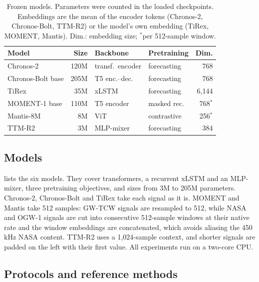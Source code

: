 \documentclass{article}
\begin{document}
\begin{table}[t]
  \caption{Frozen models. Parameters were counted in the loaded checkpoints. Embeddings are the mean of
  the encoder tokens (Chronos-2, Chronos-Bolt, TTM-R2) or the model's own embedding (TiRex, MOMENT,
  Mantis). Dim.: embedding size; $^*$per 512-sample window.}
  \label{tab:models}
  \centering
  \footnotesize
  \setlength{\tabcolsep}{3pt}
  \begin{tabular}{@{}lrllr@{}}
    \toprule
    Model & Size & Backbone & Pretraining & Dim. \\
    \midrule
    Chronos-2 & 120M & transf.\ encoder & forecasting & 768 \\
    Chronos-Bolt base & 205M & T5 enc.--dec. & forecasting & 768 \\
    TiRex & 35M & xLSTM & forecasting & 6{,}144 \\
    MOMENT-1 base & 110M & T5 encoder & masked rec. & 768$^*$ \\
    Mantis-8M & 8M & ViT & contrastive & 256$^*$ \\
    TTM-R2 & 3M & MLP-mixer & forecasting & 384 \\
    \bottomrule
  \end{tabular}
\end{table}

\subsection{Models}
 lists the six models. They cover transformers, a recurrent xLSTM and an MLP-mixer,
three pretraining objectives, and sizes from 3M to 205M parameters. Chronos-2, Chronos-Bolt and TiRex take each signal
as it is. MOMENT and Mantis take 512 samples: GW-TCW signals are resampled to 512, while NASA and OGW-1
signals are cut into consecutive 512-sample windows at their native rate and the window embeddings are
concatenated, which avoids aliasing the 450\,kHz NASA content. TTM-R2 uses a 1{,}024-sample context, and
shorter signals are padded on the left with their first value. All experiments run on a two-core CPU.

\subsection{Protocols and reference methods}
\label{sec:protocols}
\end{document}
